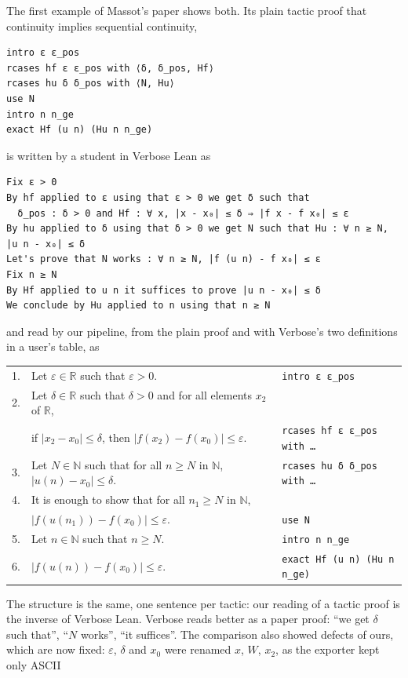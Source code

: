 \documentclass{easychair}
\newcommand{\ttt}[1]{\texttt{#1}}
\begin{document}
The first example of Massot's paper shows both. Its plain tactic proof that continuity implies
sequential continuity,
\begin{lstlisting}
intro ε ε_pos
rcases hf ε ε_pos with ⟨δ, δ_pos, Hf⟩
rcases hu δ δ_pos with ⟨N, Hu⟩
use N
intro n n_ge
exact Hf (u n) (Hu n n_ge)
\end{lstlisting}
is written by a student in Verbose Lean as
\begin{lstlisting}
Fix ε > 0
By hf applied to ε using that ε > 0 we get δ such that
  δ_pos : δ > 0 and Hf : ∀ x, |x - x₀| ≤ δ ⇒ |f x - f x₀| ≤ ε
By hu applied to δ using that δ > 0 we get N such that Hu : ∀ n ≥ N, |u n - x₀| ≤ δ
Let's prove that N works : ∀ n ≥ N, |f (u n) - f x₀| ≤ ε
Fix n ≥ N
By Hf applied to u n it suffices to prove |u n - x₀| ≤ δ
We conclude by Hu applied to n using that n ≥ N
\end{lstlisting}
and read by our pipeline, from the plain proof and with Verbose's two definitions in a user's
table, as
\begin{center}\footnotesize
\begin{tabular}{rll}
1. & Let $\varepsilon \in \mathbb{R}$ such that $\varepsilon > 0$. & \ttt{intro ε ε\_pos}\\
2. & Let $\delta \in \mathbb{R}$ such that $\delta > 0$ and for all elements $x_2$ of
     $\mathbb{R}$, & \\
   & \quad if $|x_2 - x_0| \leq \delta$, then $|f(x_2) - f(x_0)| \leq \varepsilon$. &
     \ttt{rcases hf ε ε\_pos with \ldots}\\
3. & Let $N \in \mathbb{N}$ such that for all $n \geq N$ in $\mathbb{N}$,
     $|u(n) - x_0| \leq \delta$. & \ttt{rcases hu δ δ\_pos with \ldots}\\
4. & It is enough to show that for all $n_1 \geq N$ in $\mathbb{N}$, & \\
   & \quad $|f(u(n_1)) - f(x_0)| \leq \varepsilon$. & \ttt{use N}\\
5. & \quad Let $n \in \mathbb{N}$ such that $n \geq N$. & \ttt{intro n n\_ge}\\
6. & \quad $|f(u(n)) - f(x_0)| \leq \varepsilon$. & \ttt{exact Hf (u n) (Hu n n\_ge)}
\end{tabular}
\end{center}
The structure is the same, one sentence per tactic: our reading of a tactic proof is the inverse
of Verbose Lean. Verbose reads better as a paper proof: ``we get $\delta$ such that'', ``$N$
works'', ``it suffices''. The comparison also showed defects of ours, which are now fixed:
$\varepsilon$, $\delta$ and $x_0$ were renamed $x$, $W$, $x_2$, as the exporter kept only ASCII
\end{document}
